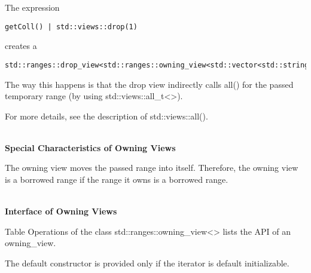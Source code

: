 The expression

\begin{lstlisting}[style=styleCXX]
getColl() | std::views::drop(1)
\end{lstlisting}

creates a

\begin{lstlisting}[style=styleCXX]
std::ranges::drop_view<std::ranges::owning_view<std::vector<std::string>>>
\end{lstlisting}

The way this happens is that the drop view indirectly calls all() for the passed temporary range (by using std::views::all\_t<>).

For more details, see the description of std::views::all().


\noindent
\hspace*{\fill} \\ %
\textbf{Special Characteristics of Owning Views}

The owning view moves the passed range into itself. Therefore, the owning view is a borrowed range if the range it owns is a borrowed range.

\noindent
\hspace*{\fill} \\ %
\textbf{Interface of Owning Views}

Table Operations of the class std::ranges::owning\_view<> lists the API of an owning\_view.

The default constructor is provided only if the iterator is default initializable.

